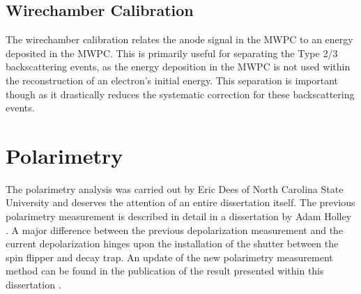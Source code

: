 \subsection{Wirechamber Calibration}

The wirechamber calibration relates the anode signal in the MWPC to an energy deposited in the MWPC. This is
primarily useful for separating the Type 2/3 backscattering events, as the
energy deposition in the MWPC is not used within the reconstruction of an electron's initial
energy. This separation is important though as it drastically reduces the systematic
correction for these backscattering events.
 

\section{Polarimetry} \label{sec:polarimetry}

The polarimetry analysis was carried out by Eric Dees of North Carolina State University and
deserves the attention of an entire dissertation itself. The previous polarimetry measurement
is described in detail in a dissertation by Adam Holley \cite{holley2012ultracold}. A major
difference between the previous depolarization measurement and the current depolarization
hinges upon the installation of the shutter between the spin flipper and decay trap. An
update of the new polarimetry measurement method can be found in the publication of the result
presented within this dissertation \cite{brown2017}.

